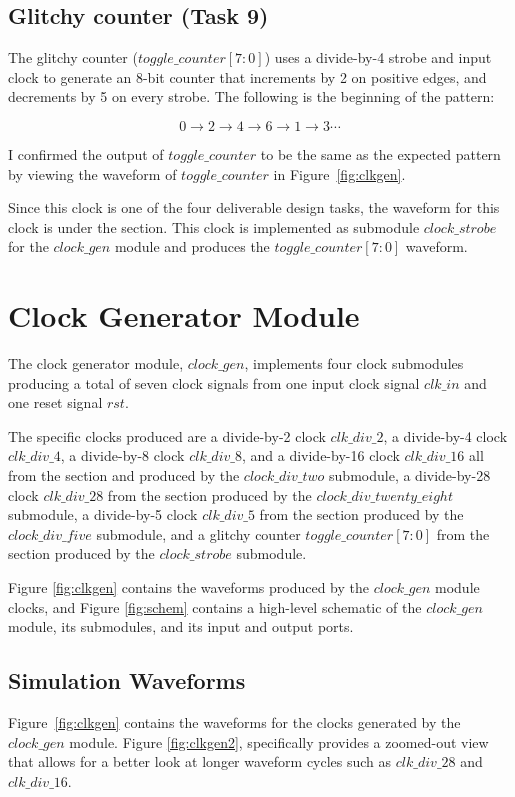 \documentclass{article}
\begin{document}
\subsection{Glitchy counter (Task 9)}\label{sec:glitchy}
The glitchy counter ($toggle\_counter[7:0]$) uses a divide-by-4 strobe and input clock to generate an 8-bit counter that increments by 2 on positive edges, and decrements by 5 on every strobe. The following is the beginning of the pattern:

$$0 \rightarrow 2 \rightarrow 4 \rightarrow 6 \rightarrow 1 \rightarrow 3 \cdots$$

I confirmed the output of $toggle\_counter$ to be the same as the expected pattern by viewing the waveform of $toggle\_counter$ in Figure~\ref{fig:clkgen}.

Since this clock is one of the four deliverable design tasks, the waveform for this clock is under the  section. This clock is implemented as submodule $clock\_strobe$ for the $clock\_gen$ module and produces the $toggle\_counter[7:0]$ waveform.

\section{Clock Generator Module}\label{sec:clkgen}
The clock generator module, $clock\_gen$, implements four clock submodules producing a total of seven clock signals from one input clock signal $clk\_in$ and one reset signal $rst$. 

The specific clocks produced are a divide-by-2 clock $clk\_div\_2$, a divide-by-4 clock $clk\_div\_4$, a divide-by-8 clock $clk\_div\_8$, and a divide-by-16 clock $clk\_div\_16$ all from the  section and produced by the $clock\_div\_two$ submodule, a divide-by-28 clock $clk\_div\_28$ from the  section produced by the $clock\_div\_twenty\_eight$ submodule, a divide-by-5 clock $clk\_div\_5$ from the  section produced by the $clock\_div\_five$ submodule, and a glitchy counter $toggle\_counter[7:0]$ from the  section produced by the $clock\_strobe$ submodule. 

Figure \ref{fig:clkgen} contains the waveforms produced by the $clock\_gen$ module clocks, and Figure \ref{fig:schem} contains a high-level schematic of the $clock\_gen$ module, its submodules, and its input and output ports.

\subsection{Simulation Waveforms}
Figure~\ref{fig:clkgen} contains the waveforms for the clocks generated by the $clock\_gen$ module. Figure \ref{fig:clkgen2}, specifically provides a zoomed-out view that allows for a better look at longer waveform cycles such as $clk\_div\_28$ and $clk\_div\_16$.
\end{document}
